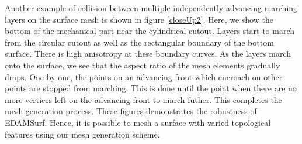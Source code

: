 Another example of collision between multiple independently advancing marching layers on the surface mesh is shown in figure \ref{closeUp2}. Here, we show the bottom of the mechanical part near the cylindrical cutout. Layers start to march from the circular cutout as well as the rectangular boundary of the bottom surface. There is high anisotropy at these boundary curves. As the layers march onto the surface, we see that the aspect ratio of the mesh elements gradually drops. One by one, the points on an advancing front which encroach on other points are stopped from marching. This is done until the point when there are no more vertices left on the advancing front to march futher. This completes the mesh generation process. These figures demonstrates the robustness of EDAMSurf. Hence, it is possible to mesh a surface with varied topological features using our mesh generation scheme.

